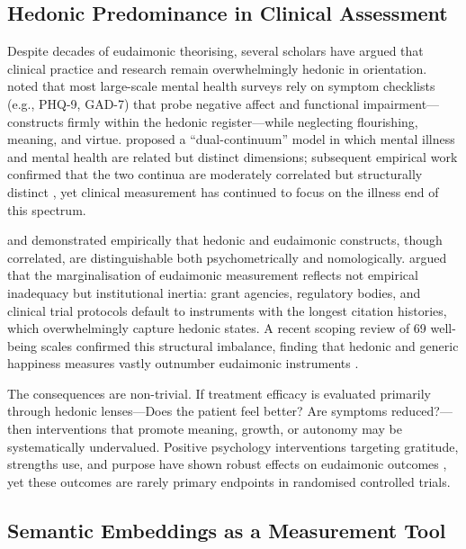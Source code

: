 \documentclass[12pt,a4paper]{article}
\begin{document}
\subsection{Hedonic Predominance in Clinical Assessment}

Despite decades of eudaimonic theorising, several scholars have argued that clinical practice and research remain overwhelmingly hedonic in orientation.
\citet{huppert2009exploring} noted that most large-scale mental health surveys rely on symptom checklists (e.g., PHQ-9, GAD-7) that probe negative affect and functional impairment---constructs firmly within the hedonic register---while neglecting flourishing, meaning, and virtue.
\citet{keyes2002mental} proposed a ``dual-continuum'' model in which mental illness and mental health are related but distinct dimensions; subsequent empirical work confirmed that the two continua are moderately correlated but structurally distinct \citep{keyes2005mental}, yet clinical measurement has continued to focus on the illness end of this spectrum.

\citet{kashdan2008reconsidering} and \citet{disabato2016different} demonstrated empirically that hedonic and eudaimonic constructs, though correlated, are distinguishable both psychometrically and nomologically.
\citet{vittersø2016handbook} argued that the marginalisation of eudaimonic measurement reflects not empirical inadequacy but institutional inertia: grant agencies, regulatory bodies, and clinical trial protocols default to instruments with the longest citation histories, which overwhelmingly capture hedonic states.
A recent scoping review of 69 well-being scales confirmed this structural imbalance, finding that hedonic and generic happiness measures vastly outnumber eudaimonic instruments \citep{zhang2024scoping}.

The consequences are non-trivial.
If treatment efficacy is evaluated primarily through hedonic lenses---Does the patient feel better? Are symptoms reduced?---then interventions that promote meaning, growth, or autonomy may be systematically undervalued.
Positive psychology interventions targeting gratitude, strengths use, and purpose have shown robust effects on eudaimonic outcomes
\citep{seligman2005positive, sin2009enhancing},
yet these outcomes are rarely primary endpoints in randomised controlled trials.

\subsection{Semantic Embeddings as a Measurement Tool}
\end{document}
